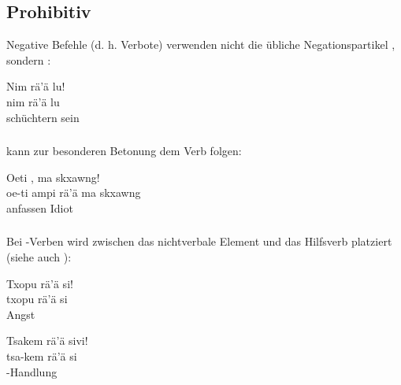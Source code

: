 
\subsection{Prohibitiv} Negative Befehle (d. h. Verbote) verwenden nicht die übliche Negationspartikel , sondern : \label{syntax:prohibitions}

\begin{interlin}
	\glll \Npawl{}Nim rä'ä lu! \\
	nim rä'ä lu \\
	schüchtern  sein \\
\end{interlin}

\subsubsection{}  kann zur besonderen Betonung dem Verb folgen:

\begin{interlin}
	\glll \Npawl{}Oeti  , ma skxawng! \\
	oe-ti ampi rä'ä ma skxawng \\
	 anfassen   Idiot \\
\end{interlin}

\subsubsection{} Bei -Verben wird  zwischen das nichtverbale Element und das Hilfsverb  platziert (siehe auch ):

\begin{interlin}
	\glll Txopu rä'ä si! \\
	txopu rä'ä si \\
	Angst   \\
\end{interlin}

\begin{interlin}
	\glll Tsakem rä'ä sivi! \\
	tsa-kem rä'ä si \\
	-Handlung   \\
\end{interlin}

